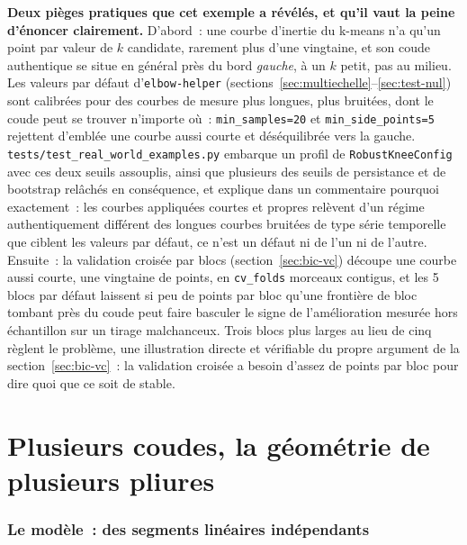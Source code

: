 \documentclass[11pt]{article}
\newcommand{\code}[1]{\texttt{#1}}
\begin{document}
\textbf{Deux pièges pratiques que cet exemple a révélés, et qu'il vaut la
peine d'énoncer clairement.} D'abord~: une courbe d'inertie du k-means n'a
qu'un point par valeur de $k$ candidate, rarement plus d'une vingtaine, et
son coude authentique se situe en général près du bord \emph{gauche}, à un
$k$ petit, pas au milieu. Les valeurs par défaut d'\code{elbow-helper}
(sections~\ref{sec:multiechelle}--\ref{sec:test-nul}) sont calibrées pour
des courbes de mesure plus longues, plus bruitées, dont le coude peut se
trouver n'importe où~: \code{min\_samples=20} et \code{min\_side\_points=5}
rejettent d'emblée une courbe aussi courte et déséquilibrée vers la gauche.
\code{tests/test\_real\_world\_examples.py} embarque un profil de
\code{RobustKneeConfig} avec ces deux seuils assouplis, ainsi que plusieurs
des seuils de persistance et de bootstrap relâchés en conséquence, et
explique dans un commentaire pourquoi exactement~: les courbes appliquées
courtes et propres relèvent d'un régime authentiquement différent des
longues courbes bruitées de type série temporelle que ciblent les valeurs
par défaut, ce n'est un défaut ni de l'un ni de l'autre. Ensuite~: la
validation croisée par blocs (section~\ref{sec:bic-vc}) découpe une courbe
aussi courte, une vingtaine de points, en \code{cv\_folds} morceaux
contigus, et les 5 blocs par défaut laissent si peu de points par bloc
qu'une frontière de bloc tombant près du coude peut faire basculer le signe
de l'amélioration mesurée hors échantillon sur un tirage malchanceux. Trois
blocs plus larges au lieu de cinq règlent le problème, une illustration
directe et vérifiable du propre argument de la section~\ref{sec:bic-vc}~:
la validation croisée a besoin d'assez de points par bloc pour dire quoi
que ce soit de stable.

\part{Plusieurs coudes, la géométrie de plusieurs pliures}
\label{part:plusieurs}

\section{Le modèle~: des segments linéaires indépendants}
\end{document}
